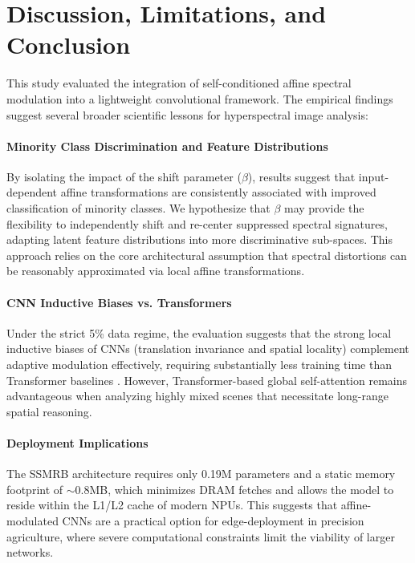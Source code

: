 \documentclass[pdflatex,sn-mathphys-num]{sn-jnl}
\theoremstyle{thmstyleone}
\theoremstyle{thmstyletwo}
\theoremstyle{thmstylethree}
\begin{document}
\section{Discussion, Limitations, and Conclusion}
This study evaluated the integration of self-conditioned affine spectral modulation into a lightweight convolutional framework. The empirical findings suggest several broader scientific lessons for hyperspectral image analysis:

\paragraph{Minority Class Discrimination and Feature Distributions}
By isolating the impact of the shift parameter ($\beta$), results suggest that input-dependent affine transformations are consistently associated with improved classification of minority classes. We hypothesize that $\beta$ may provide the flexibility to independently shift and re-center suppressed spectral signatures, adapting latent feature distributions into more discriminative sub-spaces. This approach relies on the core architectural assumption that spectral distortions can be reasonably approximated via local affine transformations.

\paragraph{CNN Inductive Biases vs. Transformers}
Under the strict 5\% data regime, the evaluation suggests that the strong local inductive biases of CNNs (translation invariance and spatial locality) complement adaptive modulation effectively, requiring substantially less training time than Transformer baselines \cite{hong2022spectralformer,sun2022ssftt}. However, Transformer-based global self-attention remains advantageous when analyzing highly mixed scenes that necessitate long-range spatial reasoning.

\paragraph{Deployment Implications}
The SSMRB architecture requires only 0.19M parameters and a static memory footprint of $\sim$0.8MB, which minimizes DRAM fetches and allows the model to reside within the L1/L2 cache of modern NPUs. This suggests that affine-modulated CNNs are a practical option for edge-deployment in precision agriculture, where severe computational constraints limit the viability of larger networks.
\end{document}
